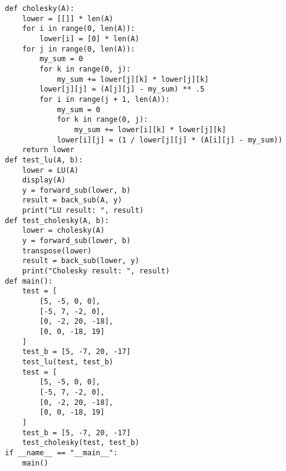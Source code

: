 \documentclass{article}
\begin{document}
\begin{enumerate}
\begin{lstlisting}
def cholesky(A):
    lower = [[]] * len(A)
    for i in range(0, len(A)):
        lower[i] = [0] * len(A)
    for j in range(0, len(A)):
        my_sum = 0
        for k in range(0, j):
            my_sum += lower[j][k] * lower[j][k]
        lower[j][j] = (A[j][j] - my_sum) ** .5
        for i in range(j + 1, len(A)):
            my_sum = 0
            for k in range(0, j):
                my_sum += lower[i][k] * lower[j][k]
            lower[i][j] = (1 / lower[j][j] * (A[i][j] - my_sum))
    return lower
def test_lu(A, b):
    lower = LU(A)
    display(A)
    y = forward_sub(lower, b)
    result = back_sub(A, y)
    print("LU result: ", result)
def test_cholesky(A, b):
    lower = cholesky(A)
    y = forward_sub(lower, b)
    transpose(lower)
    result = back_sub(lower, y)
    print("Cholesky result: ", result)
def main():
    test = [
        [5, -5, 0, 0],
        [-5, 7, -2, 0],
        [0, -2, 20, -18],
        [0, 0, -18, 19]
    ]
    test_b = [5, -7, 20, -17]
    test_lu(test, test_b)
    test = [
        [5, -5, 0, 0],
        [-5, 7, -2, 0],
        [0, -2, 20, -18],
        [0, 0, -18, 19]
    ]
    test_b = [5, -7, 20, -17]
    test_cholesky(test, test_b)
if __name__ == "__main__":
    main()
\end{lstlisting}
\end{enumerate}
\end{document}

